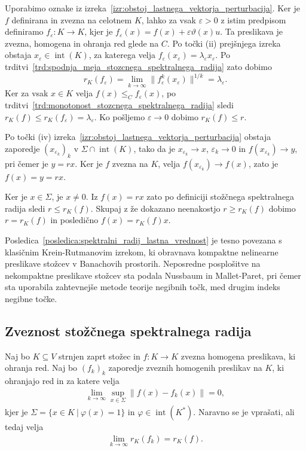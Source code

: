 \documentclass[mat2, tisk]{fmfdelo}
\begin{document}
\begin{dokaz}
  Uporabimo oznake iz
  izreka~\ref{izr:obstoj_lastnega_vektorja_perturbacija}.
  Ker je $f$ definirana in zvezna na celotnem $K$,
  lahko za vsak $\varepsilon>0$ z istim predpisom definiramo
  $f_\varepsilon:K\longrightarrow K$, kjer je
  $f_\varepsilon(x)=f(x)+\varepsilon\vartheta(x)u$.
  Ta preslikava je zvezna, homogena in ohranja red
  glede na $C$. Po točki (ii) prejšnjega izreka
  obstaja $x_\varepsilon\in\operatorname{int}(K)$,
  za katerega velja
  $f_\varepsilon(x_\varepsilon)=\lambda_\varepsilon x_\varepsilon$.
  Po trditvi~\ref{trd:spodnja_meja_stozcnega_spektralnega_radija}
  zato dobimo
  \[
  r_K(f_\varepsilon)
  =\lim\limits_{k\to\infty}\|f_\varepsilon^k(x_\varepsilon)\|^{1/k}
  =\lambda_\varepsilon.
  \]
  Ker za vsak $x\in K$ velja $f(x)\leq_C f_\varepsilon(x)$,
  po trditvi~\ref{trd:monotonost_stozcnega_spektralnega_radija}
  sledi $r_K(f)\leq r_K(f_\varepsilon)=\lambda_\varepsilon$.
  Ko pošljemo $\varepsilon\to0$ dobimo
  $r_K(f)\leq r$.

  Po točki (iv) izreka~\ref{izr:obstoj_lastnega_vektorja_perturbacija}
  obstaja zaporedje $(x_{\varepsilon_k})_k$ v
  $\Sigma\cap\operatorname{int}(K)$, tako da je
  $x_{\varepsilon_k}\longrightarrow x$,
  $\varepsilon_k\longrightarrow0$ in
  $f(x_{\varepsilon_k})\longrightarrow y$, pri čemer je $y=rx$.
  Ker je $f$ zvezna na $K$, velja
  $f(x_{\varepsilon_k})\longrightarrow f(x)$, zato je
  $f(x)=y=rx$.

  Ker je $x\in\Sigma$, je $x\neq0$. Iz
  $f(x)=rx$ zato po definiciji stožčnega spektralnega radija sledi
  $r\leq r_K(f)$. Skupaj z že dokazano neenakostjo
  $r\geq r_K(f)$ dobimo $r=r_K(f)$ in posledično
  $f(x)=r_K(f)x$.
\end{dokaz}

Posledica~\ref{posledica:spektralni_radij_lastna_vrednost} je tesno
povezana s klasičnim Krein-Rutmanovim izrekom, ki
obravnava kompaktne nelinearne preslikave stožcev v Banachovih
prostorih. Neposredne posplošitve na nekompaktne preslikave stožcev
sta podala Nussbaum in Mallet-Paret, pri čemer sta uporabila
zahtevnejše metode teorije negibnih točk, med drugim indeks negibne
točke.






\subsection{Zveznost stožčnega spektralnega radija}

Naj bo $K\subseteq V$ strnjen zaprt stožec in
$f\colon K\longrightarrow K$ zvezna homogena preslikava, ki ohranja red.
Naj bo $(f_k)_k$ zaporedje zveznih homogenih preslikav na $K$, ki ohranjajo red
in za katere velja
\begin{align}
\lim_{k\to\infty}\sup_{x\in\Sigma}\|f(x)-f_k(x)\|=0,
\label{eq:enakomerna_konvergenca_fk}
\end{align}
kjer je $\Sigma=\{x\in K ~|~ \varphi(x)=1\}$ in
$\varphi\in\operatorname{int}(K^*)$.
Naravno se je vprašati, ali tedaj velja
\begin{align}
\lim_{k\to\infty}r_K(f_k)=r_K(f).
\label{eq:zveznost_stozcnega_spektralnega_radija}
\end{align}
\end{document}
